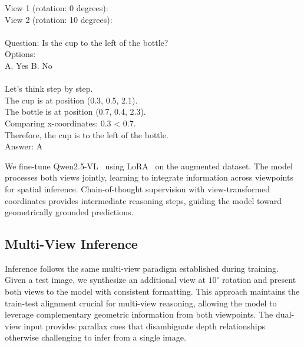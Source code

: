 \begin{promptbox}
\small
View 1 (rotation: 0 degrees):\\
View 2 (rotation: 10 degrees):\\
\\
Question: Is the cup to the left of the bottle?\\
Options:\\
A. Yes \quad B. No\\
\\
Let's think step by step.\\
The cup is at position (0.3, 0.5, 2.1).\\
The bottle is at position (0.7, 0.4, 2.3).\\
Comparing x-coordinates: 0.3 < 0.7.\\
Therefore, the cup is to the left of the bottle.\\
Answer: A
\end{promptbox}

We fine-tune Qwen2.5-VL~\cite{bai2025qwen25vl} using LoRA~\cite{hu2021lora} on the augmented dataset. The model processes both views jointly, learning to integrate information across viewpoints for spatial inference. Chain-of-thought supervision with view-transformed coordinates provides intermediate reasoning steps, guiding the model toward geometrically grounded predictions.

\subsection{Multi-View Inference}

Inference follows the same multi-view paradigm established during training. Given a test image, we synthesize an additional view at $10^\circ$ rotation and present both views to the model with consistent formatting. This approach maintains the train-test alignment crucial for multi-view reasoning, allowing the model to leverage complementary geometric information from both viewpoints. The dual-view input provides parallax cues that disambiguate depth relationships otherwise challenging to infer from a single image.
